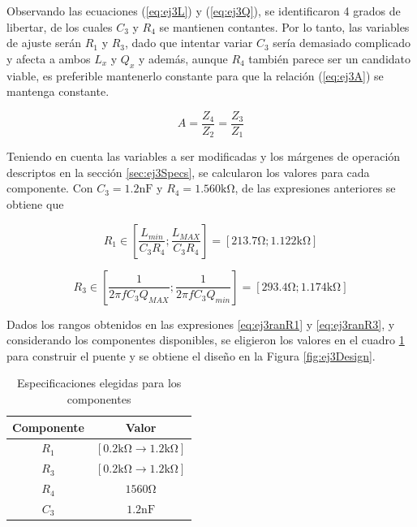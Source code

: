     Observando las ecuaciones (\ref{eq:ej3L}) y (\ref{eq:ej3Q}), se identificaron 4 grados
    de libertar, de los cuales $C_3$ y $R_4$ se mantienen contantes. Por lo tanto, las variables
    de ajuste serán $R_1$ y $R_3$, dado que intentar variar $C_3$ sería demasiado 
    complicado y afecta a ambos $L_x$ y $Q_x$ y además, aunque $R_4$ también parece
    ser un candidato viable, es preferible mantenerlo constante para que la relación
    (\ref{eq:ej3A}) se mantenga constante.
    
    \begin{equation}
        A=\frac{Z_4}{Z_2}=\frac{Z_3}{Z_1}
        \label{eq:ej3A}
    \end{equation}
    
    Teniendo en cuenta las variables a ser modificadas y los márgenes de operación
    descriptos en la sección \ref{sec:ej3Specs}, se calcularon los valores para cada componente.
    Con $C_3=1.2\si{\nano\farad}$ y $R_4=1.560\si{\kilo\ohm}$, de las expresiones anteriores se 
    obtiene que

    \begin{equation}
        R_1 \in \left[\frac{L_{min}}{C_3 R_4};\frac{L_{MAX}}{C_3 R_4}\right] = [213.7\si{\ohm}; 1.122\si{\kilo\ohm}]
        \label{eq:ej3ranR1}
    \end{equation}

    \begin{equation}
        R_3 \in \left[\frac{1}{2 \pi f C_3 Q_{MAX}}; \frac{1}{2 \pi f C_3 Q_{min}}\right] = [293.4\si{\ohm}; 1.174\si{\kilo\ohm}]
        \label{eq:ej3ranR3}
    \end{equation}

    Dados los rangos obtenidos en las expresiones \ref{eq:ej3ranR1} y \ref{eq:ej3ranR3}, y considerando
    los componentes disponibles, se eligieron los valores en el cuadro \ref{tab:ej3Specs} para construir
    el puente y se obtiene el diseño en la Figura \ref{fig:ej3Design}.

    \begin{table}[h]
        \begin{center}
            \begin{tabular}{|c|c|}
                \hline
                Componente & Valor \\
                \hline
                $R_1$ & $[0.2\si{\kilo\ohm} \rightarrow 1.2\si{\kilo\ohm}]$\\
                $R_3$ & $[0.2\si{\kilo\ohm} \rightarrow 1.2\si{\kilo\ohm}]$\\
                $R_4$ & $1560\si{\ohm}$\\
                $C_3$ & $1.2\si{\nano\farad}$\\
                \hline
            \end{tabular}
            \caption{Especificaciones elegidas para los componentes}
            \label{tab:ej3Specs}
        \end{center}
    \end{table}

